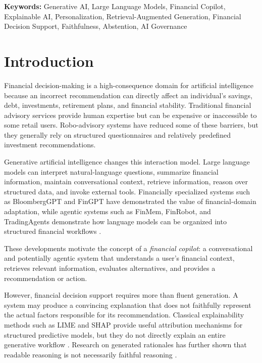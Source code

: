 \documentclass[12pt,a4paper]{article}
\begin{document}
\textbf{Keywords:} Generative AI, Large Language Models, Financial Copilot, Explainable AI, Personalization, Retrieval-Augmented Generation, Financial Decision Support, Faithfulness, Abstention, AI Governance

\tableofcontents
\newpage

\section{Introduction}

Financial decision-making is a high-consequence domain for artificial intelligence because an incorrect recommendation can directly affect an individual's savings, debt, investments, retirement plans, and financial stability. Traditional financial advisory services provide human expertise but can be expensive or inaccessible to some retail users. Robo-advisory systems have reduced some of these barriers, but they generally rely on structured questionnaires and relatively predefined investment recommendations.

Generative artificial intelligence changes this interaction model. Large language models can interpret natural-language questions, summarize financial information, maintain conversational context, retrieve information, reason over structured data, and invoke external tools. Financially specialized systems such as BloombergGPT and FinGPT have demonstrated the value of financial-domain adaptation, while agentic systems such as FinMem, FinRobot, and TradingAgents demonstrate how language models can be organized into structured financial workflows \cite{wu2023bloomberg,yang2023fingpt,yu2025finmem,yang2024finrobot,xiao2024tradingagents}.

These developments motivate the concept of a \textit{financial copilot}: a conversational and potentially agentic system that understands a user's financial context, retrieves relevant information, evaluates alternatives, and provides a recommendation or action.

However, financial decision support requires more than fluent generation. A system may produce a convincing explanation that does not faithfully represent the actual factors responsible for its recommendation. Classical explainability methods such as LIME and SHAP provide useful attribution mechanisms for structured predictive models, but they do not directly explain an entire generative workflow \cite{ribeiro2016lime,lundberg2017shap}. Research on generated rationales has further shown that readable reasoning is not necessarily faithful reasoning \cite{jacovi2020faithfulness,turpin2023unfaithful,lanham2023faithfulness}.
\end{document}
